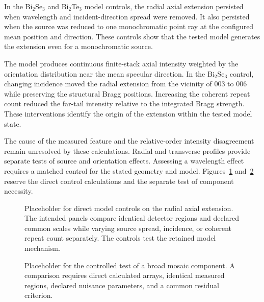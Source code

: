 In the Bi$_2$Se$_3$ and Bi$_2$Te$_3$ model controls, the radial axial extension persisted when wavelength and incident-direction spread were removed. It also persisted when the source was reduced to one monochromatic point ray at the configured mean position and direction. These controls show that the tested model generates the extension even for a monochromatic source.

The model produces continuous finite-stack axial intensity weighted by the orientation distribution near the mean specular direction. In the Bi$_2$Se$_3$ control, changing incidence moved the radial extension from the vicinity of $003$ to $006$ while preserving the structural Bragg positions. Increasing the coherent repeat count reduced the far-tail intensity relative to the integrated Bragg strength. These interventions identify the origin of the extension within the tested model state.

The cause of the measured feature and the relative-order intensity disagreement remain unresolved by these calculations. Radial and transverse profiles provide separate tests of source and orientation effects. Assessing a wavelength effect requires a matched control for the stated geometry and model. Figures~\ref{fig:si_axial_controls} and~\ref{fig:si_mosaic_ablation} reserve the direct control calculations and the separate test of component necessity.


\begin{figure}[!htbp]
  \centering
  \caption{Placeholder for direct model controls on the radial axial extension. The intended panels compare identical detector regions and declared common scales while varying source spread, incidence, or coherent repeat count separately. The controls test the retained model mechanism.}
  \label{fig:si_axial_controls}
\end{figure}


\begin{figure}[!htbp]
  \centering
  \caption{Placeholder for the controlled test of a broad mosaic component. A comparison requires direct calculated arrays, identical measured regions, declared nuisance parameters, and a common residual criterion.}
  \label{fig:si_mosaic_ablation}
\end{figure}
